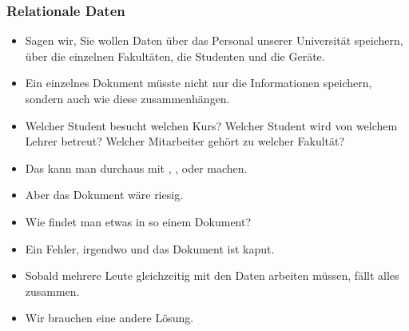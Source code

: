 \documentclass[aspectratio=169,mathserif,notheorems]{beamer}%
\begin{document}
\begin{frame}[t]%
\frametitle{Relationale Daten}%
\begin{itemize}%
\item Sagen wir, Sie wollen Daten über das Personal unserer Universität speichern, über die einzelnen Fakultäten, die Studenten und die Geräte.%
\item<3-> Ein einzelnes Dokument müsste nicht nur die Informationen speichern, sondern auch wie diese zusammenhängen.%
\item<4-> Welcher Student besucht welchen Kurs? Welcher Student wird von welchem Lehrer betreut? Welcher Mitarbeiter gehört zu welcher Fakultät?%
\item<5-> Das kann man durchaus mit , , oder  machen.%
\item<6-> Aber das Dokument wäre riesig.%
\item<7-> Wie findet man etwas in so einem Dokument?%
\item<8-> Ein Fehler, irgendwo und das Dokument ist kaput.%
\item<9-> Sobald mehrere Leute gleichzeitig mit den Daten arbeiten müssen, fällt alles zusammen.%
\item<10-> Wir brauchen eine andere Lösung.%
\end{itemize}%
%
\end{frame}%
%
\end{document}
